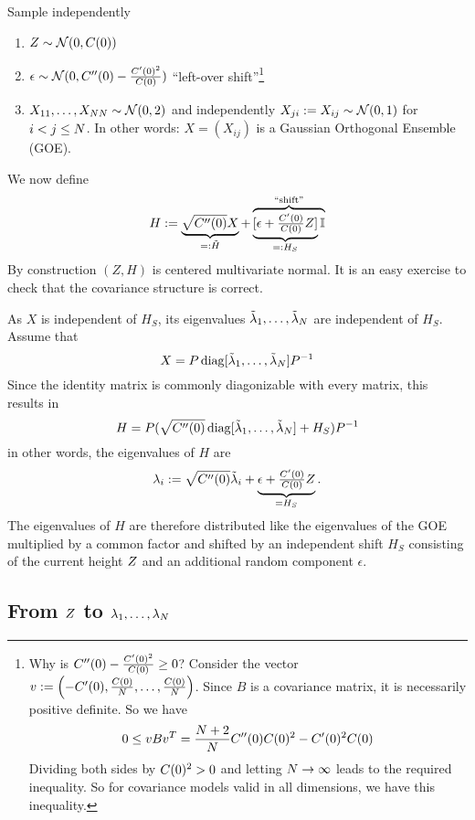 Sample independently
\begin{enumerate}
	\item \(Z\sim\mathcal{N}(0, C(0))\)
	\item \(\epsilon \sim \mathcal{N}(0, C''(0) - \frac{C'(0)^2}{C(0)})\)
	``left-over shift''\footnote{
		Why is \(C''(0) - \frac{C'(0)^2}{C(0)} \ge 0\)? Consider the
		vector \(v:=\left(-C'(0), \frac{C(0)}{N}, \dots,
		\frac{C(0)}{N}\right)\).  Since \(B\) is a covariance matrix, it
		is necessarily positive definite.
		So we have
		\[
			0 \le v B v^T
			= \frac{N+2}{N}C''(0)C(0)^2 - C'(0)^2C(0)
		\]
		Dividing both sides by \(C(0)^2 > 0\) and letting \(N\to\infty\)
		leads to the required inequality. So for covariance models valid in all
		dimensions, we have this inequality.
	}
	\item \(X_{11},\dots,X_{NN}\sim\mathcal{N}(0, 2)\) and
	independently \(X_{ji}:=X_{ij}\sim\mathcal{N}(0,1)\) for \(i<j\le N\).
	In other words: \(X = (X_{ij})\) is a Gaussian Orthogonal Ensemble (GOE).
\end{enumerate}
We now define
\[
	H := \underbrace{\sqrt{C''(0)}X}_{=:\tilde{H}}
	+ \overbrace{\underbrace{[\epsilon + \tfrac{C'(0)}{C(0)} Z]}_{=:H_S}\mathbb{I}}^{\text{``shift''}}
\]
By construction \((Z,H)\) is centered multivariate normal. It is an easy
exercise to check that the covariance structure is correct.

As \(X\) is independent of \(H_S\), its eigenvalues
\(\tilde{\lambda}_1,\dots,\tilde{\lambda}_N\) are independent of
\(H_S\). Assume that
\[
	X = P\operatorname{diag}[\tilde{\lambda}_1,\dots,\tilde{\lambda}_N]P^{-1}
\]
Since the identity matrix is commonly diagonizable with every matrix, this
results in
\[
	H = P(\sqrt{C''(0)} \operatorname{diag}[\tilde{\lambda}_1,\dots,\tilde{\lambda}_N] + H_S) P^{-1}
\]
in other words, the eigenvalues of \(H\) are
\[
	\lambda_i
	:= \sqrt{C''(0)}\tilde{\lambda}_i + \underbrace{\epsilon + \tfrac{C'(0)}{C(0)}Z}_{=H_S}.
\]
The eigenvalues of \(H\) are therefore distributed like the eigenvalues of the
GOE multiplied by a common factor and shifted by an independent shift \(H_S\)
consisting of the current height \(Z\) and an additional random component
\(\epsilon\).

\subsection{\texorpdfstring{From \(Z\) to \(\lambda_1,\dots,\lambda_N\)}{From Z to λ1,...,λN}}

